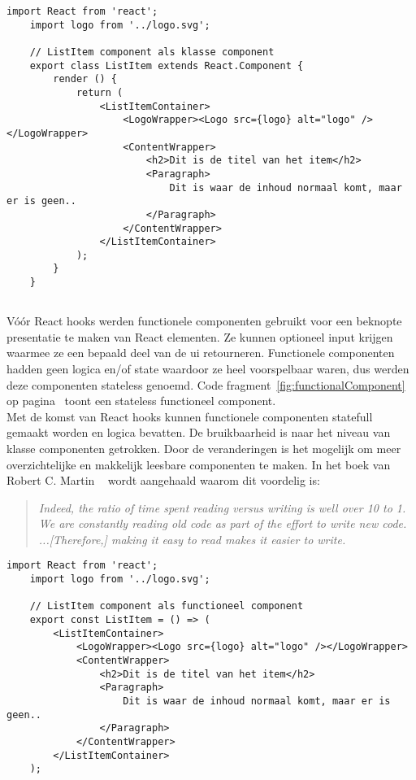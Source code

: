 \newpage
\begin{lstlisting}[caption=Een klasse component, label={fig:classComponent}]
    import React from 'react';
    import logo from '../logo.svg';
    
    // ListItem component als klasse component
    export class ListItem extends React.Component {
        render () {
            return (
                <ListItemContainer>
                    <LogoWrapper><Logo src={logo} alt="logo" /></LogoWrapper>
                    <ContentWrapper>
                        <h2>Dit is de titel van het item</h2>
                        <Paragraph>
                            Dit is waar de inhoud normaal komt, maar er is geen..
                        </Paragraph>
                    </ContentWrapper>
                </ListItemContainer>
            );
        }
    }
\end{lstlisting}

\subsection{}
\label{sec:funcComp}

Vóór React hooks werden functionele componenten gebruikt voor een beknopte presentatie te maken van React elementen. Ze kunnen optioneel input krijgen waarmee ze een bepaald deel van de \gls{ui} retourneren. Functionele componenten hadden geen logica en/of state waardoor ze heel voorspelbaar waren, dus werden deze componenten stateless genoemd. Code fragment~\ref{fig:functionalComponent} op pagina~\pageref{fig:functionalComponent} toont een stateless functioneel component.\\
Met de komst van React hooks kunnen functionele componenten statefull gemaakt worden en logica bevatten. De bruikbaarheid is naar het niveau van klasse componenten getrokken. Door de veranderingen is het mogelijk om meer overzichtelijke en makkelijk leesbare componenten te maken. In het boek van Robert C. Martin ~\autocite{Martin2008} wordt aangehaald waarom dit voordelig is:

\begin{quote}
    \textit{Indeed, the ratio of time spent reading versus writing is well over 10 to 1. We are constantly reading old code as part of the effort to write new code. ...[Therefore,] making it easy to read makes it easier to write.}
\end{quote}

\begin{lstlisting}[caption=Een functioneel component, label={fig:functionalComponent}]
    import React from 'react';
    import logo from '../logo.svg';
    
    // ListItem component als functioneel component
    export const ListItem = () => (
        <ListItemContainer>
            <LogoWrapper><Logo src={logo} alt="logo" /></LogoWrapper>
            <ContentWrapper>
                <h2>Dit is de titel van het item</h2>
                <Paragraph>
                    Dit is waar de inhoud normaal komt, maar er is geen..
                </Paragraph>
            </ContentWrapper>
        </ListItemContainer>
    );
\end{lstlisting}

